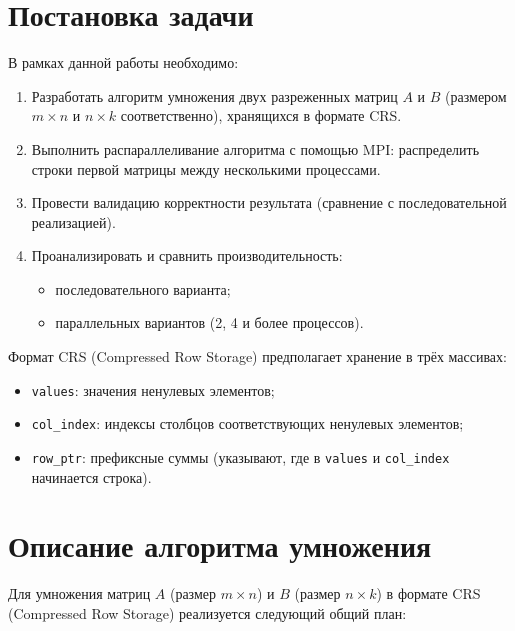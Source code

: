\documentclass[12pt]{article}
\begin{document}
\section{Постановка задачи}
В рамках данной работы необходимо:
\begin{enumerate}
    \item Разработать алгоритм умножения двух разреженных матриц $A$ и $B$ (размером $m\times n$ и $n\times k$ соответственно), хранящихся в формате CRS.
    \item Выполнить распараллеливание алгоритма с помощью MPI: распределить строки первой матрицы между несколькими процессами.
    \item Провести валидацию корректности результата (сравнение с последовательной реализацией).
    \item Проанализировать и сравнить производительность:
        \begin{itemize}
            \item последовательного варианта;
            \item параллельных вариантов (2, 4 и более процессов).
        \end{itemize}
\end{enumerate}

Формат CRS (Compressed Row Storage) предполагает хранение в трёх массивах:
\begin{itemize}
    \item \texttt{values}: значения ненулевых элементов;
    \item \texttt{col\_index}: индексы столбцов соответствующих ненулевых элементов;
    \item \texttt{row\_ptr}: префиксные суммы (указывают, где в \texttt{values} и \texttt{col\_index} начинается строка).
\end{itemize}


\section{Описание алгоритма умножения}

Для умножения матриц \(A\) (размер \(m \times n\)) и \(B\) (размер \(n \times k\)) в формате CRS (Compressed Row Storage) реализуется следующий общий план:
\end{document}
